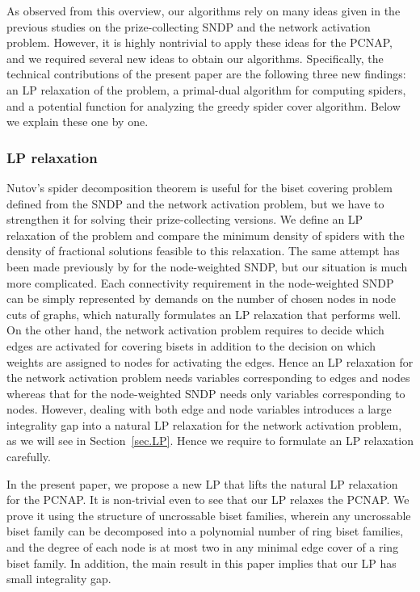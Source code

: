 \documentclass[11pt]{article}
\begin{document}
As observed from this overview,
our algorithms rely on many ideas
given in the previous studies on the prize-collecting
SNDP and the network activation problem.
However, it is highly nontrivial to apply these ideas for the PCNAP, and 
we required several new ideas to obtain our algorithms.
Specifically,
the technical contributions of the present paper are the following three new findings:
an LP relaxation of the problem,
a primal-dual algorithm for computing spiders, and a 
potential
function for analyzing the greedy spider cover algorithm.
Below we explain these one by one.


\subsubsection*{LP relaxation}
Nutov's spider decomposition theorem is useful for 
the biset covering problem defined from the
SNDP and the network activation problem, but 
we have to strengthen it for solving their prize-collecting versions. 
We define an LP relaxation of the problem
and compare the minimum density of spiders with the density of
fractional solutions feasible to this relaxation. The same attempt has
been made previously by
\cite{BateniHL13,ChekuriEV12,Konemann13CoRR} for the node-weighted SNDP,
but our situation is much more complicated.
Each connectivity requirement in the node-weighted SNDP can be simply represented 
by demands on the number of chosen nodes in node cuts of graphs,
which naturally formulates an LP relaxation that performs well.
On the other hand,
the network
activation problem requires to decide which edges are
activated for covering bisets in addition to the decision on which weights are assigned to nodes
for activating the edges.
Hence an LP relaxation for the network activation problem needs
variables corresponding to edges and nodes whereas that for the node-weighted SNDP 
needs only variables corresponding to nodes.
However, 
dealing with both edge and node variables introduces 
a large integrality gap into
a natural LP relaxation for the network
activation problem, as we will see in Section~\ref{sec.LP}.
Hence we require to formulate an LP relaxation carefully.

In the present paper, 
we propose a new LP that lifts the natural LP relaxation for the PCNAP.
It is non-trivial even to see that our LP relaxes the PCNAP.
We prove it
using the structure of uncrossable biset families, wherein
any uncrossable biset family
can be decomposed into 
a polynomial number of ring biset families,
and 
the degree of each node is at most two in
any minimal edge cover of a ring biset family.
In addition,
the main result in this paper implies that
our LP has small integrality gap.
\end{document}

